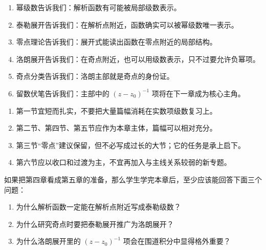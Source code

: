 \begin{tishi}[本章的知识骨架]
\begin{enumerate}
    \item 幂级数告诉我们：解析函数有可能被局部级数表示。
    \item 泰勒展开告诉我们：在解析点附近，函数确实可以被幂级数唯一表示。
    \item 零点理论告诉我们：展开式能读出函数在零点附近的局部结构。
    \item 洛朗展开告诉我们：在奇点附近，也可以用级数表示，只不过要允许负幂项。
    \item 奇点分类告诉我们：洛朗主部就是奇点的身份证。
    \item 留数伏笔告诉我们：主部中的 $(z-z_0)^{-1}$ 项将在下一章成为核心主角。
\end{enumerate}
\end{tishi}

\begin{tishi}[正式写作时的篇幅建议]
\begin{enumerate}
    \item 第一节宜短而扎实，不要把大量篇幅消耗在实数项级数复习上。
    \item 第二节、第四节、第五节应作为本章主体，篇幅可以相对充分。
    \item 第三节``零点''建议保留，但不必写成过长的大节；它的任务是承上启下。
    \item 第六节应以收口和过渡为主，不宜再加入与主线关系较弱的新专题。
\end{enumerate}
\end{tishi}

\begin{sikao}{}{}
如果把第四章看成第五章的准备，那么学生学完本章后，至少应该能回答下面三个问题：
\begin{enumerate}
    \item 为什么解析函数一定能在解析点附近写成泰勒级数？
    \item 为什么研究奇点时要把泰勒展开推广为洛朗展开？
    \item 为什么洛朗展开里的 $(z-z_0)^{-1}$ 项会在围道积分中显得格外重要？
\end{enumerate}
\end{sikao}
